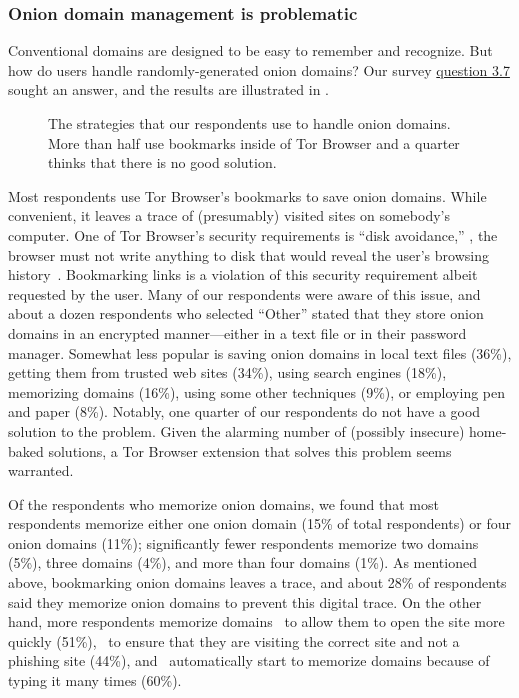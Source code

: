 \subsubsection{Onion domain management is problematic}

Conventional domains are designed to be easy to remember and recognize.  But how
do users handle randomly-generated onion domains?  Our survey
\hyperref[q3_7]{question 3.7} sought an answer, and the results are illustrated
in .

\begin{figure}[t]
    \centering
    
    \caption{The strategies that our respondents use to handle onion domains.
    More than half use bookmarks inside of Tor Browser and a quarter thinks that
    there is no good solution.}
    \label{fig:onion-domain-mgmt}
\end{figure}

Most respondents use Tor Browser's bookmarks to save onion domains.  While
convenient, it leaves a trace of (presumably) visited sites on somebody's
computer.  One of Tor Browser's security requirements is ``disk avoidance,''
\ie, the browser must not write anything to disk that would reveal the user's
browsing history~\cite[\S~2.1]{Perry2017a}.  Bookmarking links is a violation of
this security requirement albeit requested by the user.  Many of our respondents
were aware of this issue, and about a dozen respondents who selected ``Other''
stated that they store onion domains in an encrypted manner---either in a text
file or in their password manager.  Somewhat less popular is saving onion
domains in local text files (36\%), getting them from trusted web sites (34\%),
using search engines (18\%), memorizing domains (16\%), using some other
techniques (9\%), or employing pen and paper (8\%).  Notably, one quarter of our
respondents do not have a good solution to the problem.  Given the alarming
number of (possibly insecure) home-baked solutions, a Tor Browser extension that
solves this problem seems warranted.

Of the respondents who memorize onion domains, we found that most respondents
memorize either one onion domain (15\% of total respondents) or four onion
domains (11\%); significantly fewer respondents memorize two domains (5\%),
three domains (4\%), and more than four domains (1\%).  As mentioned above,
bookmarking onion domains leaves a trace, and about 28\% of respondents said
they memorize onion domains to prevent this digital trace.  On the other hand,
more respondents memorize domains \first~to allow them to open the site more
quickly (51\%), \second~to ensure that they are visiting the correct site and
not a phishing site (44\%), and \third~automatically start to memorize domains
because of typing it many times (60\%).

